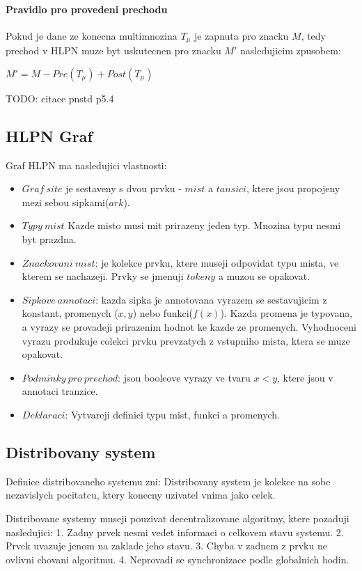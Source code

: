 \paragraph*{Pravidlo pro provedeni prechodu}
Pokud je dane ze konecna multimnozina $T_\mu$ je zapnuta pro znacku $M$, tedy prechod v HLPN muze byt uskutecnen pro znacku $M'$ nasledujicim zpusobem:
\begin{center}
  $M' = M - Pre(T_\mu) + Post(T_\mu)$
\end{center}
TODO: citace pnstd p5.4
\subsection{HLPN Graf}
Graf HLPN ma nasledujici vlastnosti:
\begin{itemize}
  \item $Graf\:site$ je sestaveny s dvou prvku - $mist$ a $tansici$, ktere jsou propojeny mezi sebou sipkami($ark$).
  \item $Typy\:mist$ Kazde misto musi mit prirazeny jeden typ. Mnozina typu nesmi byt prazdna.
  \item $Znackovani\:mist$: je kolekce prvku, ktere museji odpovidat typu mista, ve kterem se nachazeji. Prvky se jmenuji $tokeny$ a muzou se opakovat.
  \item $Sipkove\:annotaci$: kazda sipka je annotovana vyrazem se sestavujicim z konstant, promenych ($x, y$) nebo funkci($f(x)$). Kazda promena je typovana, a vyrazy se provadeji prirazenim hodnot ke kazde ze promenych. Vyhodnoceni vyrazu produkuje colekci prvku prevzatych z vstupniho mista, ktera se muze opakovat.
  \item $Podminky\:pro\:prechod$: jsou booleove vyrazy ve tvaru $x < y$, ktere jsou v annotaci tranzice.
  \item $Deklaraci$: Vytvareji definici typu mist, funkci a promenych.
\end{itemize}

\subsection{Distribovany system}
Definice distribovaneho systemu zni:
Distribovany system je kolekce na sobe nezavislych pocitatcu, ktery konecny uzivatel vnima jako celek. 

Distribovane systemy museji pouzivat decentralizovane algoritmy, ktere pozaduji nasledujici: 1. Zadny prvek nesmi vedet informaci o celkovem stavu systemu. 2. Prvek uvazuje jenom na zaklade jeho stavu. 3. Chyba v zadnem z prvku ne ovlivni chovani algoritmu. 4. Neprovadi se synchronizace podle globalnich hodin. 

